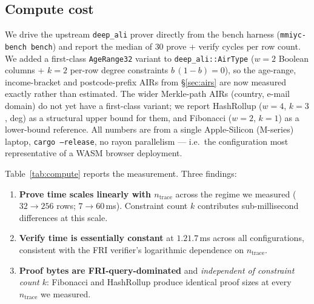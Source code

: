 \documentclass[11pt,a4paper]{article}
\begin{document}
\subsection{Compute cost}
\label{sec:eval-compute}

We drive the upstream \texttt{deep\_ali} prover directly from the
bench harness (\texttt{mmiyc-bench bench}) and report the median
of $30$ prove + verify cycles per row count.  We added a
first\nobreakdash-class \texttt{AgeRange32} variant to
\texttt{deep\_ali::AirType} ($w=2$ Boolean columns + $k=2$
per\nobreakdash-row degree constraints
$b\,(1-b) = 0$), so the age\nobreakdash-range, income\nobreakdash-bracket
and postcode\nobreakdash-prefix AIRs from \S\ref{sec:airs} are
now measured exactly rather than estimated.  The wider
Merkle\nobreakdash-path AIRs (country, e\nobreakdash-mail
domain) do not yet have a first\nobreakdash-class variant; we
report HashRollup ($w=4$, $k=3$, deg) as a
structural upper bound for them, and Fibonacci ($w=2$, $k=1$)
as a lower\nobreakdash-bound reference.  All numbers are from a
single Apple\nobreakdash-Silicon (M\nobreakdash-series) laptop,
\texttt{cargo --release}, no rayon parallelism — i.e.\ the
configuration most representative of a WASM browser deployment.

Table~\ref{tab:compute} reports the measurement.  Three findings:

\begin{enumerate}
  \item \textbf{Prove time scales linearly with $n_\mathrm{trace}$}
        across the regime we measured ($32 \to 256$ rows;
        $7 \to 60$\,ms).  Constraint count $k$ contributes
        sub\nobreakdash-millisecond differences at this scale.
  \item \textbf{Verify time is essentially constant} at
        $1.2$\textendash$1.7$\,ms across all configurations,
        consistent with the FRI verifier's logarithmic dependence
        on $n_\mathrm{trace}$.
  \item \textbf{Proof bytes are FRI\nobreakdash-query\nobreakdash-dominated}
        and \emph{independent of constraint count $k$}: Fibonacci
        and HashRollup produce identical proof sizes at every
        $n_\mathrm{trace}$ we measured.
\end{enumerate}
\end{document}
